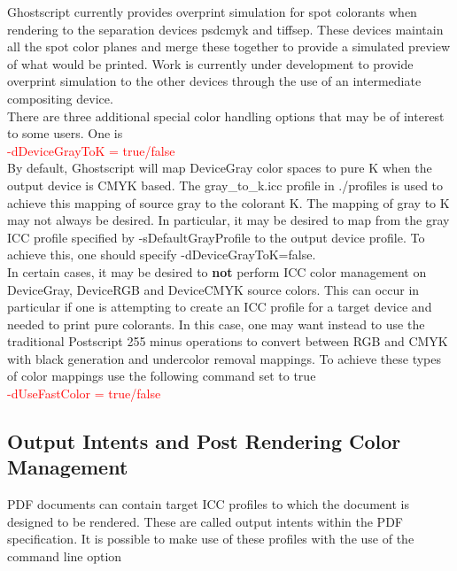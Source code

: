 \documentclass[12pt,notitlepage]{article}
\begin{document}
Ghostscript currently provides overprint simulation for spot colorants when rendering to the separation devices psdcmyk and tiffsep.  These devices maintain all the spot color planes and merge these together to provide a simulated preview of what would be printed.   Work is currently under development to provide overprint simulation to the other devices through the use of an intermediate compositing device.\\

There are three additional special color handling options that may be of interest to some users.  One is\\

\textcolor{red}{-dDeviceGrayToK = true/false}\\

\noindent By default, Ghostscript will map DeviceGray color spaces to pure K when the output device is CMYK based. The gray\_to\_k.icc profile in ./profiles is used to achieve this mapping of source gray to the colorant K.  The mapping of gray to K may not always be desired. In particular, it may be desired to map from the gray ICC profile specified by -sDefaultGrayProfile to the output device profile. To achieve this, one should specify -dDeviceGrayToK=false.\\

In certain cases, it may be desired to {\bf not} perform ICC color management on DeviceGray, DeviceRGB and DeviceCMYK source colors.  This can occur in particular if one is attempting to create an ICC profile for a target device and needed to print pure colorants.  In this case, one may want instead to use the traditional Postscript 255 minus operations to convert between RGB and CMYK with black generation and undercolor removal mappings.  To achieve these types of color mappings use the following command set to true\\

\textcolor{red}{-dUseFastColor = true/false}\\

\subsection{Output Intents and Post Rendering Color Management}
\label{sec:Transparency}
PDF documents can contain target ICC profiles to which the document is designed to be rendered.  These are called output intents within the PDF specification.   It is possible to make use of these profiles with the use of the command line option\\
\end{document}
